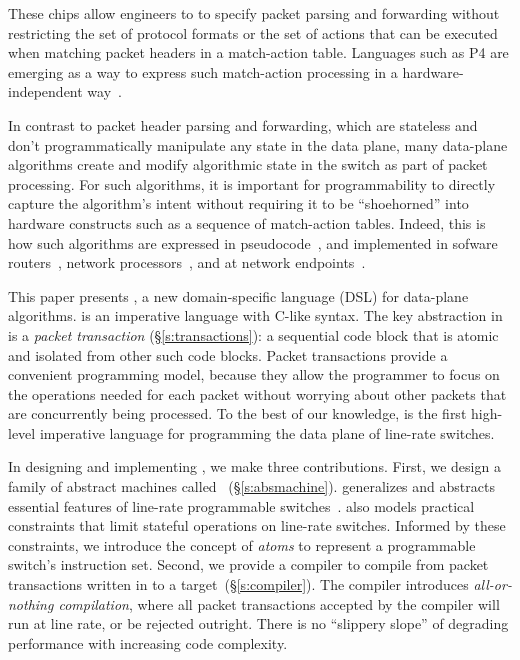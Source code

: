 These chips allow engineers to to specify packet parsing and
forwarding without restricting the set of protocol formats or the set
of actions that can be executed when matching packet headers in a
match-action table. Languages such as P4 are emerging as a way to
express such match-action processing in a hardware-independent
way~\cite{p4,p4spec,dc_p4}.


In contrast to packet header parsing and forwarding, which are stateless
and don't programmatically manipulate any state in the data plane, many data-plane algorithms
create and modify algorithmic state in the switch as part of packet
processing. For such algorithms, it is important for programmability to
directly capture the algorithm's intent without requiring it to be
``shoehorned'' into hardware constructs such as a sequence of
match-action tables. Indeed, this is how such algorithms are expressed
in pseudocode~\cite{red, csfq, codel_code, avq, blue}, and implemented
in sofware routers~\cite{click, dpdk, routebricks}, network
processors~\cite{packetc, nova}, and at network
endpoints~\cite{qdisc}.

This paper presents \pktlanguage, a new domain-specific language (DSL)
for data-plane algorithms.  \pktlanguage is an imperative language
with C-like syntax. The key abstraction in \pktlanguage is a {\em
  packet transaction} (\S\ref{s:transactions}): a sequential code
block that is atomic and isolated from other such code blocks. Packet
transactions provide a convenient programming model, because they
allow the programmer to focus on the operations needed for each packet
without worrying about other packets that are concurrently being
processed. To the best of our knowledge, \pktlanguage is the first
high-level imperative language for programming the data plane of
line-rate switches.

In designing and implementing \pktlanguage, we make three contributions.
First, we design a family of abstract machines called
\absmachine~(\S\ref{s:absmachine}). \absmachine generalizes and abstracts essential features of
line-rate programmable switches~\cite{rmt, xpliant, flexpipe}. \absmachine also
models practical constraints that limit stateful operations on line-rate
switches.  Informed by these constraints, we introduce the concept of {\em
atoms} to represent a programmable switch's instruction set.  Second, we
provide a compiler to compile from packet transactions written in \pktlanguage
to a \absmachine target~(\S\ref{s:compiler}). The \pktlanguage compiler introduces
\textit{all-or-nothing compilation}, where all packet transactions accepted by
the compiler will run at line rate, or be rejected outright. There is no
``slippery slope'' of degrading performance with increasing code complexity.

